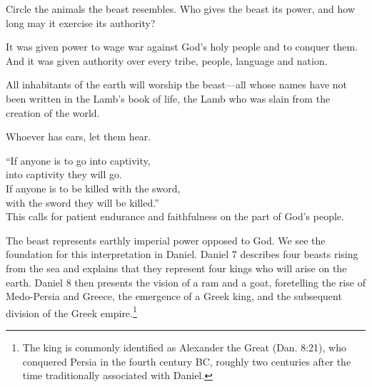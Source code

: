 \begin{ScriptureBox2}{Circle the animals the beast resembles. Who gives the beast its power, and how long may it exercise its authority?}
\item[13:7] It was given power to wage war against God's holy people and to conquer them. And it was given authority over every tribe, people, language and nation.

\item[13:8] All inhabitants of the earth will worship the beast---all whose names have not been written in the Lamb's book of life, the Lamb who was slain from the creation of the world.

\item[13:9] Whoever has ears, let them hear.

\item[13:10] \hspace*{1em}``If anyone is to go into captivity,\\
\hspace*{2em}into captivity they will go.\\
\hspace*{1em}If anyone is to be killed with the sword,\\
\hspace*{2em}with the sword they will be killed.''\\
This calls for patient endurance and faithfulness on the part of God's people.

\end{ScriptureBox2}

The beast represents earthly imperial power opposed to God. We see the foundation for this interpretation in Daniel. Daniel 7 describes four beasts rising from the sea and explains that they represent four kings who will arise on the earth. Daniel 8 then presents the vision of a ram and a goat, foretelling the rise of Medo-Persia and Greece, the emergence of a Greek king, and the subsequent division of the Greek empire.\footnote{The king is commonly identified as Alexander the Great (Dan. 8:21), who conquered Persia in the fourth century BC, roughly two centuries after the time traditionally associated with Daniel.}

